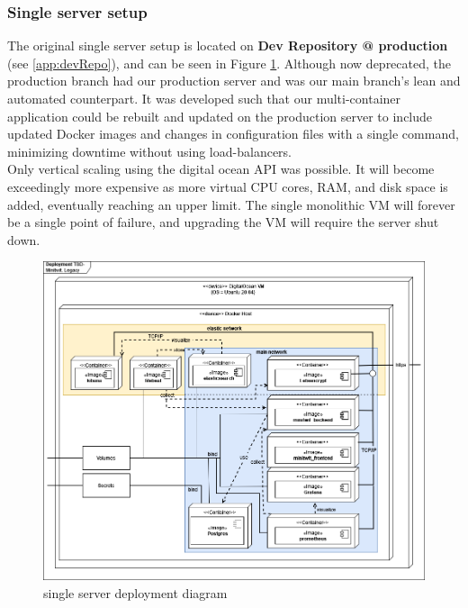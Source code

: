 \subsubsection{Single server setup}
\label{subsubsec:scalingProd}
The original single server setup is located on \textbf{Dev Repository @ production} (see \ref{app:devRepo}), and can be seen in Figure \ref{fig:legacyDeploy}.
Although now deprecated, the production branch had our production server and was our main branch's lean and automated counterpart. It was developed such that our multi-container application could be rebuilt and updated on the production server to include updated Docker images and changes in configuration files with a single command, minimizing downtime without using load-balancers.\\
Only vertical scaling using the digital ocean API was possible. It will become exceedingly more expensive as more virtual CPU cores, RAM, and disk space is added, eventually reaching an upper limit. The single monolithic VM will forever be a single point of failure, and upgrading the VM will require the server shut down.
\begin {figure}[H]
    \centering
    \includegraphics[scale=0.47]{images/deployment_diagrams/DevopsDiagrams-Legacy deploy mini.drawio.png}
    \caption{\mini single server deployment diagram}
    \label{fig:legacyDeploy}
\end{figure}

